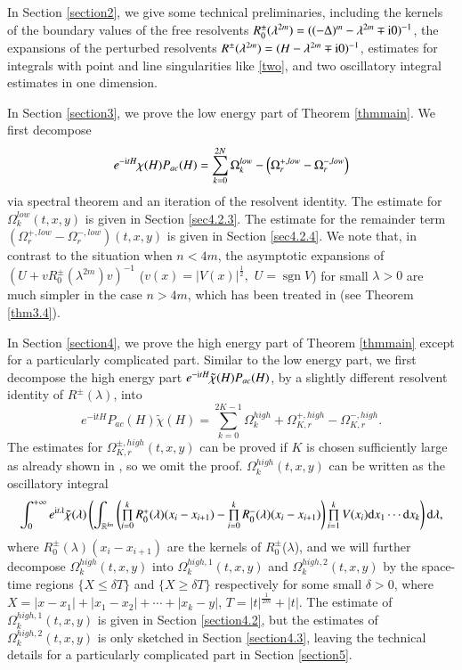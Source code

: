 \documentclass[11pt,reqno]{amsart}
\def\d{{\rm d}}
\def\i{{\rm i}}
\DeclareMathOperator{\sgn}{\text{sgn}}
\numberwithin{equation}{section}
\theoremstyle{definition}
\begin{document}
In Section \ref{section2}, we give some technical preliminaries, including the kernels of the boundary values of the free resolvents $R_0^\pm(\lambda^{2m})=((-\Delta)^m-\lambda^{2m}\mp\i 0)^{-1}$, the expansions of the perturbed resolvents $R^\pm(\lambda^{2m})=(H-\lambda^{2m}\mp\i 0)^{-1}$, estimates for integrals with point and line singularities like \eqref{two}, and two  oscillatory integral estimates in one dimension.


In Section \ref{section3}, we prove the low energy part of Theorem \ref{thmmain}. We first decompose 
$$
e^{-\i tH}\chi( H)P_{ac}(H)=\sum_{k=0}^{2N}\Omega^{low}_{k}-\left(\Omega^{+, low}_{ r}-\Omega^{-, low}_{r}\right)
$$
via spectral theorem and an iteration of the resolvent identity. The estimate for $\Omega^{low}_{k}(t,x,y)$ is given in Section \ref{sec4.2.3}. The estimate for the remainder term
$(\Omega^{+, low}_{ r}-\Omega^{-, low}_{r})(t,x,y)$ is given in Section \ref{sec4.2.4}. We note that, in contrast to the situation when  $n<4m$, the
asymptotic expansions of $(U+vR_0^\pm(\lambda^{2m})v)^{-1}$ ($v(x)=|V(x)|^{\frac12}, \,\,U=\sgn V$) for small $\lambda>0$ are much simpler in the case $n>4m$, which has been treated in \cite{FSWY} (see Theorem \ref{thm3.4}).


In Section \ref{section4}, we prove the high energy part of Theorem \ref{thmmain} except for a particularly complicated part. Similar to the low energy part, we first decompose the high energy part $e^{-\i tH}\tilde{\chi}(H)P_{ac}(H)$, by a slightly different resolvent identity of $R^\pm(\lambda)$, into
\begin{equation*}
	e^{-\mathrm{i}tH}P_{ac}(H)\tilde{\chi}(H)=\sum_{k=0}^{2K-1}\Omega_k^{high}+\Omega_{K,r}^{+,high}-\Omega_{K,r}^{-,high}.
\end{equation*}
The estimates for $\Omega_{K,r}^{\pm,high}(t,x,y)$ can be proved if $K$ is chosen sufficiently large as already shown in \cite{CHHZ}, so we omit the proof. $\Omega_k^{high}(t,x,y)$ can be written as the oscillatory integral
\begin{equation*} \int_0^{+\infty}e^{\mathrm{i}t\lambda}\tilde{\chi}(\lambda)\left(\int_{\mathbb{R}^{kn}}\left(\mbox{$\prod\limits_{i=0}^kR_0^+(\lambda)(x_i-x_{i+1})-\prod\limits_{i=0}^kR_0^-(\lambda)(x_i-x_{i+1})$}\right)\mbox{$\prod\limits_{i=1}^kV(x_i)$}\d x_1\cdots\d x_k\right)\d\lambda,
\end{equation*}
where $R_0^\pm(\lambda)(x_i-x_{i+1})$ are the kernels of $R_0^\pm$($\lambda$), and we will further decompose $\Omega_k^{high}(t,x,y)$ into $\Omega_k^{high,1}(t,x,y)$ and $\Omega_k^{high,2}(t,x,y)$ by the space-time regions $\{X\leq\delta T\}$ and $\{X\geq\delta T\}$ respectively for some small $\delta>0$, where $X=|x-x_1|+|x_1-x_2|+\cdots+|x_k-y|$, $T=|t|^\frac{1}{2m}+|t|$. The estimate of $\Omega_k^{high,1}(t,x,y)$ is given in Section \ref{section4.2}, but the estimates of $\Omega_k^{high,2}(t,x,y)$ is only sketched in Section \ref{section4.3}, leaving the technical details for a particularly complicated part in Section \ref{section5}.
\end{document}
